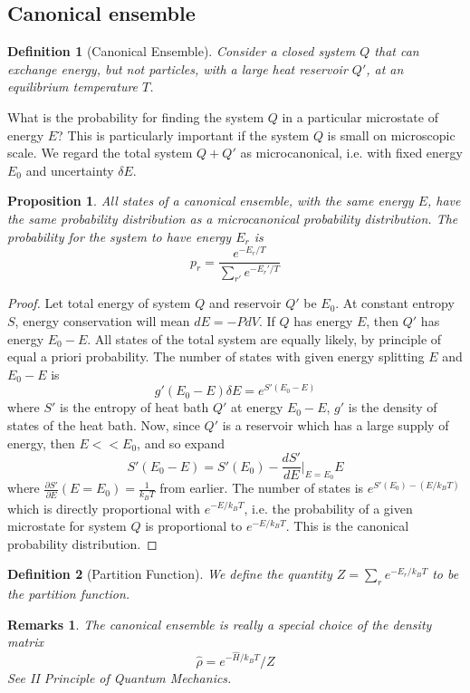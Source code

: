\documentclass[a4paper]{article}
\newtheorem{remarks}{Remarks}[section]
\theoremstyle{new}
\newtheorem{defi}{Definition}[section]
\newtheorem{prop}{Proposition}[section]
\begin{document}
\subsection{Canonical ensemble}
\begin{defi}[Canonical Ensemble]
Consider a closed system $Q$ that can exchange energy, but not particles, with a large heat reservoir $Q'$, at an equilibrium temperature $T$.
\end{defi}
What is the probability for finding the system $Q$ in a particular microstate of energy $E$? This is particularly important if the system $Q$ is small on microscopic scale. We regard the total system $Q+Q'$ as microcanonical, i.e. with fixed energy $E_0$ and uncertainty $\delta E$.
\begin{prop}
All states of a canonical ensemble, with the same energy $E$, have the same probability distribution as a microcanonical probability distribution. The probability for the system to have energy $E_r$ is
$$p_r=\frac{e^{-E_r/T}}{\sum_{r'}e^{-E_r'/T}}$$
\end{prop}
\begin{proof}
Let total energy of system $Q$ and reservoir $Q'$ be $E_0$. At constant entropy $S$, energy conservation will mean $dE=-PdV$. If $Q$ has energy $E$, then $Q'$ has energy $E_0-E$. All states of the total system are equally likely, by principle of equal a priori probability. The number of states with given energy splitting $E$ and $E_0-E$ is
$$g'(E_0-E)\delta E=e^{S'(E_0-E)}$$
where $S'$ is the entropy of heat bath $Q'$ at energy $E_0-E$, $g'$ is the density of states of the heat bath. Now, since $Q'$ is a reservoir which has a large supply of energy, then $E<<E_0$, and so expand
$$S'(E_0-E)=S'(E_0)-\frac{dS'}{dE}\bigg|_{E=E_0}E$$
where $\frac{\partial S'}{\partial E}(E=E_0)=\frac{1}{k_BT}$ from earlier. The number of states is $e^{S'(E_0)-(E/k_BT)}$ which is directly proportional with $e^{-E/k_BT}$, i.e. the probability of a given microstate for system $Q$ is proportional to $e^{-E/k_BT}$. This is the canonical probability distribution.
\end{proof}
\begin{defi}[Partition Function]
We define the quantity $Z=\sum_re^{-E_r/k_BT}$ to be the partition function.
\end{defi}
\begin{remarks}
The canonical ensemble is really a special choice of the density matrix
$$\hat{\rho}=e^{-\hat{H}/k_BT}/Z$$
See II Principle of Quantum Mechanics.
\end{remarks}
\end{document}

